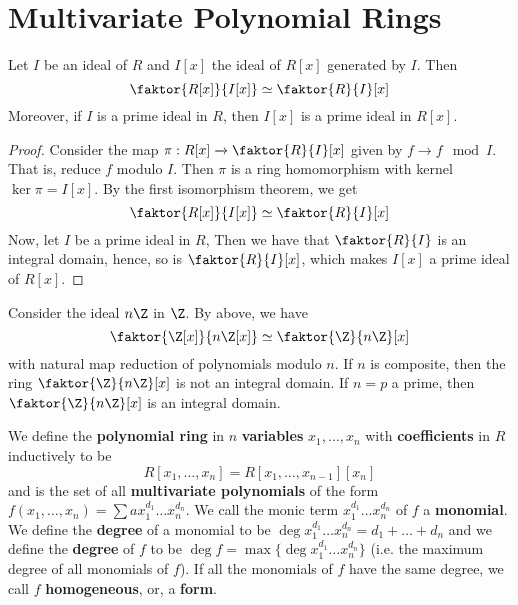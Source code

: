 \section{Multivariate Polynomial Rings}

\begin{theorem}\label{3.1.1}
    Let $I$ be an ideal of  $R$ and  $I[x]$ the ideal of $R[x]$ generated by
    $I$. Then
    \begin{equation*}
        \faktor{R[x]}{I[x]} \simeq \faktor{R}{I}[x]
    \end{equation*}
    Moreover, if $I$ is a prime ideal in $R$, then $I[x]$ is a prime ideal in
    $R[x]$.
\end{theorem}
\begin{proof}
    Consider the map $\pi:R[x] \xrightarrow{} \faktor{R}{I}[x]$ given by $f
    \xrightarrow{} f \mod{I}$. That is, reduce $f$ modulo  $I$.  Then $\pi$ is a
    ring homomorphism with kernel $\ker{\pi}=I[x]$. By the first isomorphism
    theorem, we get
    \begin{equation*}
        \faktor{R[x]}{I[x]} \simeq \faktor{R}{I}[x]
    \end{equation*}
    Now, let $I$ be a prime ideal in $R$, Then we have that $\faktor{R}{I}$ is
    an integral domain, hence, so is $\faktor{R}{I}[x]$, which makes $I[x]$ a
    prime ideal of $R[x]$.
\end{proof}

\begin{example}\label{3.1}
    Consider the ideal $n\Z$ in  $\Z$. By above, we have
    \begin{equation*}
        \faktor{\Z[x]}{n\Z[x]} \simeq \faktor{\Z}{n\Z}[x]
    \end{equation*}
    with natural map reduction of polynomials modulo $n$. If $n$ is composite,
    then the ring $\faktor{\Z}{n\Z}[x]$ is not an integral domain. If $n=p$ a
    prime, then  $\faktor{\Z}{n\Z}[x]$ is an integral domain.
\end{example}

\begin{definition}
    We define the \textbf{polynomial ring} in $n$  \textbf{variables} $x_1,
    \dots, x_n$ with \textbf{coefficients} in $R$ inductively to be
    \begin{equation*}
        R[x_1, \dots, x_n]=R[x_1, \dots, x_{n-1}][x_n]
    \end{equation*}
    and is the set of all \textbf{multivariate polynomials} of the form $f(x_1,
    \dots,x_n)=\sum{ax_1^{d_1} \dots x_n^{d_n}}$. We call the monic term
    $x_1^{d_1} \dots x_n^{d_n}$ of $f$ a  \textbf{monomial}. We define the
    \textbf{degree} of a monomial to be $\deg{x_1^{d_1} \dots
    x_n^{d_n}}=d_1+\dots+d_n$ and we define the \textbf{degree} of $f$ to be
    $\deg{f}=\max{\{\deg{x_1^{d_1} \dots x_n^{d_n}}\}}$ (i.e. the maximum degree
    of all monomials of $f$). If all the monomials of $f$ have the same degree,
    we call  $f$  \textbf{homogeneous}, or, a \textbf{form}.
\end{definition}

